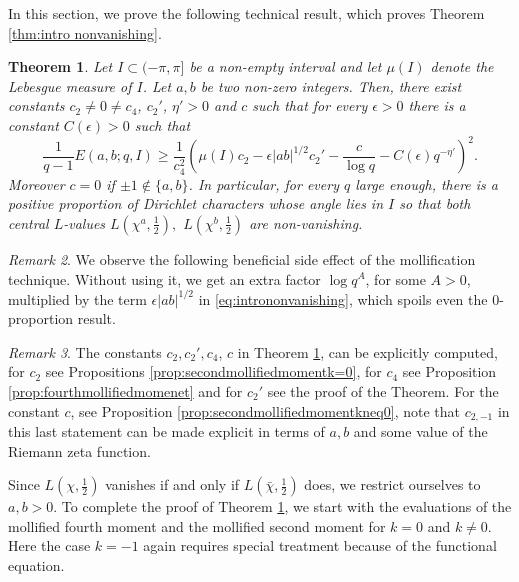 \documentclass[12pt]{amsart}
\theoremstyle{plain}
\newtheorem{thm}{Theorem}[section]
\theoremstyle{definition}
\theoremstyle{remark}
\newtheorem{rem}[thm]{Remark}
\numberwithin{equation}{section}
\renewcommand{\geq}{\geqslant}
\begin{document}
In this section, we prove the following technical result, which proves Theorem \ref{thm:intro nonvanishing}.

\begin{thm}\label{thm:non-vanishing}Let $I \subset (-\pi,\pi]$ be a non-empty interval and let $\mu(I)$ denote the Lebesgue measure of $I$. Let $a,b$ be two non-zero integers. 
Then, there exist constants $c_2 \neq 0\neq c_4$, $c_2'$, $\eta'>0$ and $c$ such that for every $\epsilon >0$ there is a constant $C(\epsilon)>0$ such that
    \begin{equation*}\label{eq:intrononvanishing2}
   \frac{1}{q-1}E(a,b;q,I) \geq \frac{1}{c_4^2}\left(\mu(I)c_2-\epsilon\vert{ab}\vert^{1/2}c_2'-\frac{c}{\log q}-C(\epsilon)q^{-\eta'}\right)^2.
\end{equation*}
Moreover $c = 0$ if $\pm 1\notin \{a,b\}$.
In particular, for every $q$ large enough, there is a positive proportion of Dirichlet characters whose angle lies in $I$ so that both central $L$-values $L\left(\chi^a,\tfrac{1}{2}\right),$ $L\left(\chi^b,\tfrac{1}{2}\right)$ are non-vanishing. 
\end{thm}


\begin{rem}\label{rem:side effect mollification technique}
    We observe the following beneficial side effect of the mollification technique. Without using it, we get an extra factor $\log q^A$, for some $A>0$, multiplied by the term $\epsilon\vert{ab}\vert^{1/2}$ in \eqref{eq:intrononvanishing}, which spoils even the $0$-proportion result.
\end{rem}

\begin{rem}
    The constants $c_2,c_2',c_4$, $c$ in Theorem \ref{thm:non-vanishing}, can be explicitly computed, for $c_2$ see Propositions \ref{prop:secondmollifiedmomentk=0}, for $c_4$ see Proposition \ref{prop:fourthmollifiedmomenet} and for $c_2'$ see the proof of the Theorem. For the constant $c$, see Proposition \ref{prop:secondmollifiedmomentkneq0}, note that $c_{2,-1}$ in this last statement can be made explicit in terms of $a,b$ and some value of the Riemann zeta function. 
\end{rem}

Since $L(\chi,\tfrac 12)$ vanishes if and only if $L(\bar\chi,\tfrac 12)$ does, we restrict ourselves to $a,b>0$. To complete the proof of Theorem \ref{thm:non-vanishing}, we start with the evaluations of the mollified fourth moment and the mollified second moment for $k=0$ and $k\neq 0$. Here the case $k=-1$ again requires special treatment because of the functional equation. 
\end{document}
